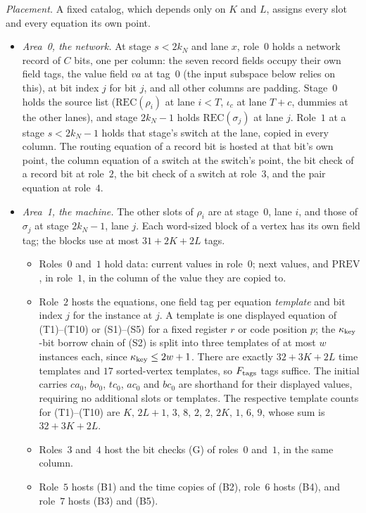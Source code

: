 \emph{Placement.} A fixed catalog, which depends only on \(K\) and
\(L\), assigns every slot and every equation its own point.
\begin{itemize}
\item \emph{Area~0, the network.} At stage \(s<2k_N\) and lane \(x\),
role~\(0\) holds a network record of \(C\) bits, one per column: the
seven record fields occupy their own field tags, the value field
\(\mathit{va}\) at tag~\(0\) (the input subspace below relies on this),
at bit index \(j\) for bit \(j\), and all other columns are padding. Stage~\(0\) holds the
source list (\(\mathrm{REC}(\rho_i)\) at lane \(i<T\), \(\iota_c\) at
lane \(T+c\), dummies at the other lanes), and stage \(2k_N-1\) holds
\(\mathrm{REC}(\sigma_j)\) at lane \(j\). Role~\(1\) at a stage
\(s<2k_N-1\) holds that stage's switch at the lane, copied in every
column. The routing equation of a record bit is hosted at that bit's
own point, the column equation of a switch at the switch's point, the
bit check of a record bit at role~\(2\), the bit check of a switch at
role~\(3\), and the pair equation at role~\(4\).
\item \emph{Area~1, the machine.} The other slots of \(\rho_i\) are at
stage~\(0\), lane \(i\), and those of \(\sigma_j\) at stage \(2k_N-1\),
lane \(j\). Each word-sized block of a vertex has its own field tag;
the blocks use at most \(31+2K+2L\) tags.
\begin{itemize}
\item Roles~\(0\) and~\(1\) hold data: current values in role~\(0\);
next values, and \(\mathrm{PREV}\), in role~\(1\), in the column of the
value they are copied to.
\item Role~\(2\) hosts the equations, one field tag per equation
\emph{template} and bit index \(j\) for the instance at \(j\). A template
is one displayed equation of (T1)--(T10) or (S1)--(S5) for a fixed
register \(r\) or code position \(p\); the \(\kappa_{\rm key}\)-bit borrow chain of
(S2) is split into three templates of at most \(w\) instances each,
since \(\kappa_{\rm key}\le2w+1\). There are exactly \(32+3K+2L\) time templates
and \(17\) sorted-vertex templates, so \(F_{\rm tags}\) tags suffice.
The initial carries \(\mathit{ca}_0\), \(\mathit{bo}_0\),
\(\mathit{tc}_0\), \(\mathit{ac}_0\) and \(\mathit{bc}_0\) are
shorthand for their displayed values, requiring no additional slots or
templates. The respective template counts for (T1)--(T10) are
\(K,\,2L+1,\,3,\,8,\,2,\,2,\,2K,\,1,\,6,\,9\), whose sum is
\(32+3K+2L\).
\item Roles~\(3\) and~\(4\) host the bit checks (G) of roles~\(0\)
and~\(1\), in the same column.
\item Role~\(5\) hosts (B1) and the time copies of (B2), role~\(6\)
hosts (B4), and role~\(7\) hosts (B3) and (B5).
\end{itemize}
\end{itemize}


